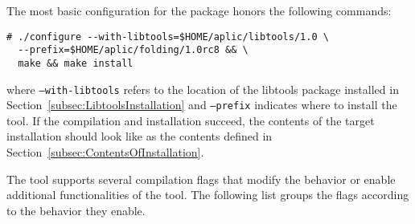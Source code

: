 The most basic configuration for the \FOLDING package honors the following commands:

\begin{verbatim}
# ./configure --with-libtools=$HOME/aplic/libtools/1.0 \
  --prefix=$HOME/aplic/folding/1.0rc8 && \
  make && make install
\end{verbatim}

where \texttt{--with-libtools} refers to the location of the libtools package installed in Section~\ref{subsec:LibtoolsInstallation} and \texttt{--prefix} indicates where to install the \FOLDING tool.
If the compilation and installation succeed, the contents of the target installation should look like as the contents defined in Section~\ref{subsec:ContentsOfInstallation}.

The \FOLDING tool supports several compilation flags that modify the behavior or enable additional functionalities of the tool.
The following list groups the flags according to the behavior they enable.

